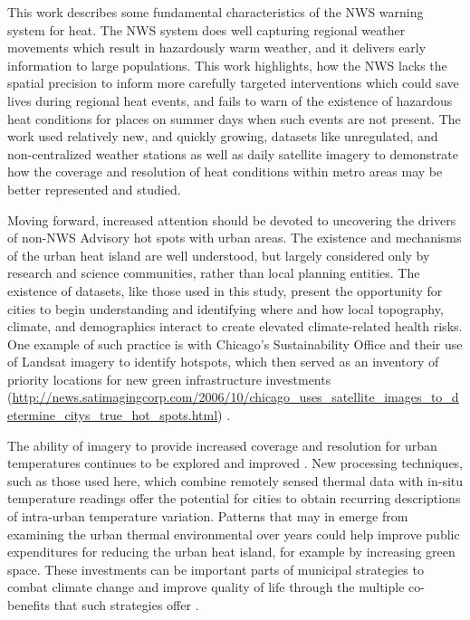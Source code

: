 \documentclass{ametsoc}
\begin{document}
This work describes some fundamental characteristics of the NWS warning system for heat. The NWS system does well capturing regional weather movements which result in hazardously warm weather, and it delivers early information to large populations. This work highlights, how the NWS lacks the spatial precision to inform more carefully targeted interventions which could save lives during regional heat events, and fails to warn of the existence of hazardous heat conditions for places on summer days when such events are not present. The work used relatively new, and quickly growing, datasets like unregulated, and non-centralized weather stations as well as daily satellite imagery to demonstrate how the coverage and resolution of heat conditions within metro areas may be better represented and studied.  

Moving forward, increased attention should be devoted to uncovering the drivers of non-NWS Advisory hot spots with urban areas. The existence and mechanisms of the urban heat island are well understood, but largely considered only by research and science communities, rather than local planning entities. The existence of datasets, like those used in this study, present the opportunity for cities to begin understanding and identifying where and how local topography, climate, and demographics interact to create elevated climate-related health risks.  One example of such practice is with Chicago's Sustainability Office and their use of Landsat imagery to identify hotspots, which then served as an inventory of priority locations for new green infrastructure investments (\url{http://news.satimagingcorp.com/2006/10/chicago_uses_satellite_images_to_determine_citys_true_hot_spots.html}) \cite{chicago} . 

The ability of imagery to provide increased coverage and resolution for urban temperatures continues to be explored and improved \cite{voogt2003}. New processing techniques, such as those used here, which combine remotely sensed thermal data with in-situ temperature readings offer the potential for cities to obtain recurring descriptions of intra-urban temperature variation. Patterns that may in emerge from examining the urban thermal environmental over years could help improve public expenditures for reducing the urban heat island, for example by increasing green space. These investments can be important parts of municipal strategies to combat climate change and improve quality of life through the multiple co-benefits that such strategies offer \cite{patz2008}. 
\end{document}
